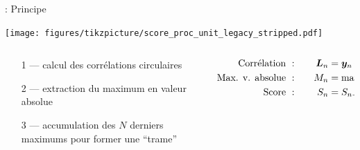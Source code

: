 \documentclass[../main.tex]{subfiles}
\begin{document}
\begin{frame}{\subsecname : {Principe}}
  \begin{center}
    \texttt{[image: figures/tikzpicture/score\_proc\_unit\_legacy\_stripped.pdf]}
  \end{center}
  \begin{columns}
    \begin{column}{.5\linewidth}
      \centering
      \begin{itemize}
        \item [1 ---] calcul des corrélations circulaires
        \item [2 ---] extraction du maximum en valeur absolue
        \item [3 ---] accumulation des $N$ derniers maximums pour former une ``trame''
      \end{itemize}
    \end{column}
    \begin{column}{.5\linewidth}
      \centering
      \begin{align*}
        \text{Corrélation }     & :\quad & \bm{L}_n & = \bm{y}_n \star \bm{P}_{0}               \\
        \text{Max. v. absolue } & :\quad & M_n        & = \mathrm{max}(|\bm{L}_n|)             \\
        \text{Score }           & :\quad & S_n        & = S_{n - q} + M_{n} - M_{n - N \times q}
      \end{align*}
    \end{column}
  \end{columns}
\end{frame}

\end{document}
